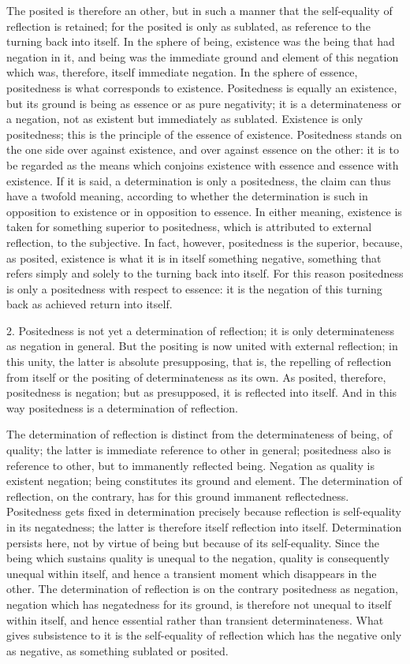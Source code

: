 The posited is therefore an other,
but in such a manner that the self-equality
of reflection is retained;
for the posited is only as sublated,
as reference to the turning back into itself.
In the sphere of being, existence was the being
that had negation in it, and being was the immediate ground
and element of this negation which was,
therefore, itself immediate negation.
In the sphere of essence,
positedness is what corresponds to existence.
Positedness is equally an existence,
but its ground is being as essence
or as pure negativity;
it is a determinateness or a negation,
not as existent but immediately as sublated.
Existence is only positedness;
this is the principle of the essence of existence.
Positedness stands on the one side over against existence,
and over against essence on the other:
it is to be regarded as the means which conjoins
existence with essence and essence with existence.
If it is said, a determination is only a positedness,
the claim can thus have a twofold meaning,
according to whether the determination is such
in opposition to existence or in opposition to essence.
In either meaning, existence is taken for something superior to positedness,
which is attributed to external reflection, to the subjective.
In fact, however, positedness is the superior, because, as posited,
existence is what it is in itself something negative,
something that refers simply and solely to the turning back into itself.
For this reason positedness is only a positedness
with respect to essence:
it is the negation of this turning back
as achieved return into itself.

2. Positedness is not yet a determination of reflection;
it is only determinateness as negation in general.
But the positing is now united with external reflection;
in this unity, the latter is absolute presupposing, that is,
the repelling of reflection from itself
or the positing of determinateness as its own.
As posited, therefore, positedness is negation;
but as presupposed, it is reflected into itself.
And in this way positedness is a determination of reflection.

The determination of reflection is distinct
from the determinateness of being, of quality;
the latter is immediate reference to other in general;
positedness also is reference to other,
but to immanently reflected being.
Negation as quality is existent negation;
being constitutes its ground and element.
The determination of reflection, on the contrary,
has for this ground immanent reflectedness.
Positedness gets fixed in determination precisely
because reflection is self-equality in its negatedness;
the latter is therefore itself reflection into itself.
Determination persists here, not by virtue of being
but because of its self-equality.
Since the being which sustains quality is
unequal to the negation, quality is
consequently unequal within itself,
and hence a transient moment which disappears in the other.
The determination of reflection is on the contrary positedness as negation,
negation which has negatedness for its ground,
is therefore not unequal to itself within itself,
and hence essential rather than transient determinateness.
What gives subsistence to it is the self-equality of reflection
which has the negative only as negative,
as something sublated or posited.

